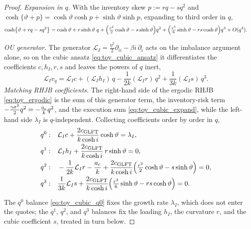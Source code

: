 \documentclass[11pt,a4paper]{article}
\newcommand{\Lcal}{\mathcal{L}}
\theoremstyle{plain}
\theoremstyle{definition}
\begin{document}
\begin{proof}
\emph{Expansion in \(q\).}  With the inventory skew \(p:=rq-sq^2\) and
\(\cosh\{\vartheta+p\}=\cosh\vartheta\cosh p+\sinh\vartheta\sinh p\), expanding
to third order in \(q\),
\begin{equation}
\cosh\bigl\{\vartheta+rq-sq^2\bigr\}
=\cosh\vartheta
+r\sinh\vartheta\;q
+\Bigl(\tfrac{r^2}2\cosh\vartheta-s\sinh\vartheta\Bigr)q^2
+\Bigl(\tfrac{r^3}6\sinh\vartheta-rs\cosh\vartheta\Bigr)q^3
+O(q^4).
\label{eq:toy_cubic_expand}
\end{equation}

\emph{OU generator.}  The generator
\(\Lcal_I=\tfrac{\eta^2}{2}\partial_{ii}-\beta i\,\partial_i\) acts on the
imbalance argument alone, so on the cubic ansatz \eqref{eq:toy_cubic_ansatz} it
differentiates the coefficients \(c,h_I,r,s\) and leaves the powers of \(q\)
inert,
\begin{equation}
\Lcal_I v_q
=\Lcal_I c+(\Lcal_I h_I)\,q-\frac{1}{2k}(\Lcal_I r)\,q^2+\frac{1}{3k}(\Lcal_I s)\,q^3 .
\label{eq:toy_cubic_OU}
\end{equation}
\emph{Matching RHJB coefficients.}  The right-hand side of the ergodic RHJB
\eqref{eq:toy_ergodic} is the sum of this
generator term, the inventory-risk term
\(-\tfrac{\gamma\sigma^2}{2}q^2=-\tfrac{a_{\rm c}}{k}q^2\), and the execution sum
\eqref{eq:toy_cubic_expand}, while the left-hand side \(\lambda_I\) is
\(q\)-independent.  Collecting coefficients order by order in \(q\),
\begin{align}
q^0:\quad &\Lcal_I c+\frac{2c_{\rm GLFT}}{k\cosh i}\cosh\vartheta=\lambda_I,
\label{eq:toy_cubic_q0}\\
q^1:\quad &\Lcal_I h_I+\frac{2c_{\rm GLFT}}{k\cosh i}\,r\sinh\vartheta=0,
\label{eq:toy_q1_match}\\
q^2:\quad &-\frac{1}{2k}\Lcal_I r-\frac{a_{\rm c}}{k}
+\frac{2c_{\rm GLFT}}{k\cosh i}\Bigl(\tfrac{r^2}2\cosh\vartheta-s\sinh\vartheta\Bigr)=0,
\label{eq:toy_cubic_q2}\\
q^3:\quad &\frac{1}{3k}\Lcal_I s
+\frac{2c_{\rm GLFT}}{k\cosh i}\Bigl(\tfrac{r^3}6\sinh\vartheta-rs\cosh\vartheta\Bigr)=0 .
\label{eq:toy_cubic_q3}
\end{align}

The \(q^0\) balance \eqref{eq:toy_cubic_q0} fixes the growth rate \(\lambda_I\), which
does not enter the quotes; the \(q^1\), \(q^2\), and \(q^3\) balances fix the
loading \(h_I\), the curvature \(r\), and the cubic coefficient \(s\), treated in
turn below.


\end{proof}
\end{document}
